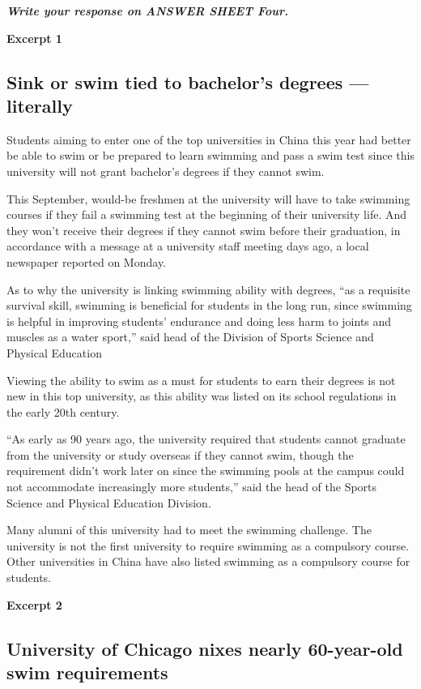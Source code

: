 \documentclass[UTF8,11pt]{ctexart}
\begin{document}
\textbf{\textit{Write your response on ANSWER SHEET Four.}}


\textbf{Excerpt 1}


\subsection*{\textbf{Sink or swim tied to bachelor’s degrees — literally}}


Students aiming to enter one of the top universities in China this year had better be able to swim or be prepared to learn swimming and pass a swim test since this university will not grant bachelor’s degrees if they cannot swim.


This September, would-be freshmen at the university will have to take swimming courses if they fail a swimming test at the beginning of their university life. And they won’t receive their degrees if they cannot swim before their graduation, in accordance with a message at a university staff meeting days ago, a local newspaper reported on Monday.


As to why the university is linking swimming ability with degrees, “as a requisite survival skill, swimming is beneficial for students in the long run, since swimming is helpful in improving students’ endurance and doing less harm to joints and muscles as a water sport,” said head of the Division of Sports Science and Physical Education


Viewing the ability to swim as a must for students to earn their degrees is not new in this top university, as this ability was listed on its school regulations in the early 20th century.


“As early as 90 years ago, the university required that students cannot graduate from the university or study overseas if they cannot swim, though the requirement didn’t work later on since the swimming pools at the campus could not accommodate increasingly more students,” said the head of the Sports Science and Physical Education Division.


Many alumni of this university had to meet the swimming challenge. The university is not the first university to require swimming as a compulsory course. Other universities in China have also listed swimming as a compulsory course for students.


\textbf{Excerpt 2}


\subsection*{\textbf{University of Chicago nixes nearly 60-year-old swim requirements}}
\end{document}
